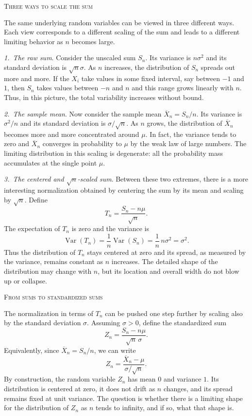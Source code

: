 \bigskip
\textsc{Three ways to scale the sum}

The same underlying random variables can be viewed in three different ways.  
Each view corresponds to a different scaling of the sum and leads to a different limiting behavior as \(n\) becomes large.

\textit{1.\ The raw sum}.  
Consider the unscaled sum \(S_n\).  
Its variance is \(n\sigma^2\) and its standard deviation is \(\sqrt{n}\sigma\).  
As \(n\) increases, the distribution of \(S_n\) spreads out more and more.  
If the \(X_i\) take values in some fixed interval, say between \(-1\) and \(1\), then \(S_n\) takes values between \(-n\) and \(n\) and this range grows linearly with \(n\).  
Thus, in this picture, the total variability increases without bound.

\textit{2.\ The sample mean}.  
Now consider the sample mean \(\overline{X}_n = S_n/n\).  
Its variance is \(\sigma^2/n\) and its standard deviation is \(\sigma/\sqrt{n}\).  
As \(n\) grows, the distribution of \(\overline{X}_n\) becomes more and more concentrated around \(\mu\).  
In fact, the variance tends to zero and \(\overline{X}_n\) converges in probability to \(\mu\) by the weak law of large numbers.  
The limiting distribution in this scaling is degenerate: all the probability mass accumulates at the single point \(\mu\).

\textit{3.\ The centered and \(\sqrt{n}\)-scaled sum}.  
Between these two extremes, there is a more interesting normalization obtained by centering the sum by its mean and scaling by \(\sqrt{n}\).  
Define
\[
T_n
=
\frac{S_n - n\mu}{\sqrt{n}}.
\]
The expectation of \(T_n\) is zero and the variance is
\[
\operatorname{Var}(T_n)
=
\frac{1}{n}\operatorname{Var}(S_n)
=
\frac{1}{n}\,n\sigma^2
=
\sigma^2.
\]
Thus the distribution of \(T_n\) stays centered at zero and its spread, as measured by the variance, remains constant as \(n\) increases.  
The detailed shape of the distribution may change with \(n\), but its location and overall width do not blow up or collapse.

\bigskip
\textsc{From sums to standardized sums}

The normalization in terms of \(T_n\) can be pushed one step further by scaling also by the standard deviation \(\sigma\).  
Assuming \(\sigma > 0\), define the standardized sum
\[
Z_n
=
\frac{S_n - n\mu}{\sqrt{n}\,\sigma}.
\]
Equivalently, since \(\overline{X}_n = S_n/n\), we can write
\[
Z_n
=
\frac{\overline{X}_n - \mu}{\sigma/\sqrt{n}}.
\]
By construction, the random variable \(Z_n\) has mean \(0\) and variance \(1\).  
Its distribution is centered at zero, it does not drift as \(n\) changes, and its spread remains fixed at unit variance.  
The question is whether there is a limiting shape for the distribution of \(Z_n\) as \(n\) tends to infinity, and if so, what that shape is.

